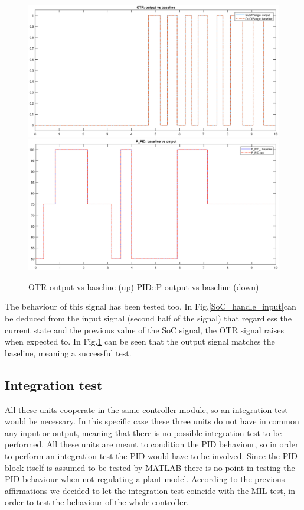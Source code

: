 \documentclass[12pt,a4paper]{report}
\begin{document}
\begin{figure}[!hbt]
	\centering
	\includegraphics[scale=0.4]{OTR_baseline_result.eps}\hfill
	\includegraphics[scale=0.4]{PidP_baseline_result.eps}
	\caption{OTR output vs baseline (up) PID::P output vs baseline (down)}
	\label{OTR_baseline_result}
\end{figure}
The behaviour of this signal has been tested too. In Fig.\ref{SoC_handle_input}can be deduced from the input signal (second half of the signal) that regardless the current state and the previous value of the SoC signal, the OTR signal raises when expected to.
In Fig.\ref{OTR_baseline_result} can be seen that the output signal matches the baseline, meaning a successful test.
\FloatBarrier
\subsection{Integration test}
All these units cooperate in the same controller module, so an integration test would be necessary. In this specific case these three units do not have in common any input or output, meaning that there is no possible integration test to be performed. All these units are meant to condition the PID behaviour, so in order to perform an integration test the PID would have to be involved. Since the PID block itself is assumed to be tested by MATLAB there is no point in testing the PID behaviour when not regulating a plant model.
According to the previous affirmations we decided to let the integration test coincide with the MIL test, in order to test the behaviour of the whole controller.
\end{document}
